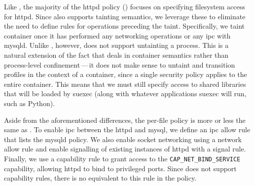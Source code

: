 Like \bpfbox{}, the majority of the \bpfcontain{} httpd policy
() focuses on specifying filesystem access for httpd. Since
\bpfcontain{} also supports tainting semantics, we leverage these to eliminate the need to
define rules for operations preceding the taint. Specifically, we taint container once it
has performed any networking operations or any \gls{ipc} with mysqld. Unlike \bpfbox{},
however, \bpfcontain{} does not support untainting a process. This is a natural extension
of the fact that \bpfcontain{} deals in container semantics rather than process-level
confinement\,---\,it does not make sense to untaint and transition profiles in the context
of a container, since a single security policy applies to the entire container. This
means that we must still specify access to shared libraries that will be loaded by suexec
(along with whatever applications suexec will run, such as Python).

Aside from the aforementioned differences, the per-file policy is more or less the same as
\bpfbox{}. To enable \gls{ipc} between the httpd and mysql, we define an \gls{ipc} allow
rule that lists the mysqld policy. We also enable socket networking using a network allow
rule and enable signalling of existing instances of httpd with a signal rule. Finally,
we use a capability rule to grant access to the \texttt{CAP\_NET\_BIND\_SERVICE} capability,
allowing httpd to bind to privileged ports. Since \bpfbox{} does not support capability rules,
there is no equivalent to this rule in the \bpfbox{} policy.

